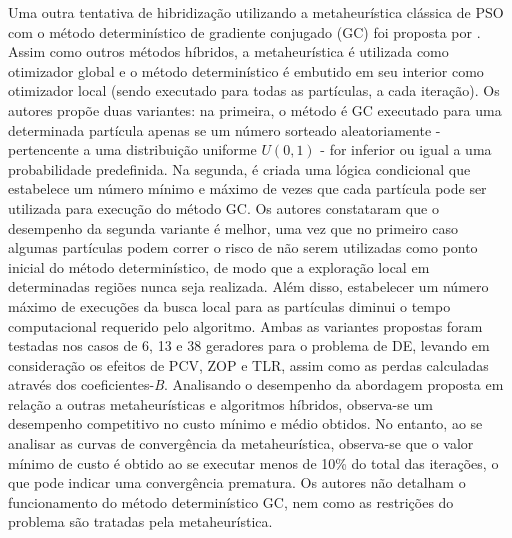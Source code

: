 \documentclass[
	12pt,				%
	openany,			%
	twoside,			%
	a4paper,			%
	chapter=TITLE,		%
	section=Title,		%
	subsection=Title,	%
	subsubsection=Title,%
	english,			%
	french,				%
	spanish,			%
	brazil			%
	]{abntex2}
\begin{document}
\begin{ERRATA}
Uma outra tentativa de hibridização utilizando a metaheurística clássica de PSO com o método determinístico de gradiente conjugado (GC) foi proposta por . Assim como outros métodos híbridos, a metaheurística é utilizada como otimizador global e o método determinístico é embutido em seu interior como otimizador local (sendo executado para todas as partículas, a cada iteração). Os autores propõe duas variantes: na primeira, o método é GC executado para uma determinada partícula apenas se um número sorteado aleatoriamente - pertencente a uma distribuição uniforme $U(0,1)$ - for inferior ou igual a uma probabilidade predefinida. Na segunda, é criada uma lógica condicional que estabelece um número mínimo e máximo de vezes que cada partícula pode ser utilizada para execução do método GC. Os autores constataram que o desempenho da segunda variante é melhor, uma vez que no primeiro caso algumas partículas podem correr o risco de não serem utilizadas como ponto inicial do método determinístico, de modo que a exploração local em determinadas regiões nunca seja realizada. Além disso, estabelecer um número máximo de execuções da busca local para as partículas diminui o tempo computacional requerido pelo algoritmo. Ambas as variantes propostas foram testadas nos casos de 6, 13 e 38 geradores para o problema de DE, levando em consideração os efeitos de PCV, ZOP e TLR, assim como as perdas calculadas através dos coeficientes-\emph{B}. Analisando o desempenho da abordagem proposta em relação a outras metaheurísticas e algoritmos híbridos, observa-se um desempenho competitivo no custo mínimo e médio obtidos. No entanto, ao se analisar as curvas de convergência da metaheurística, observa-se que o valor mínimo de custo é obtido ao se executar menos de 10\% do total das iterações, o que pode indicar uma convergência prematura. Os autores não detalham o funcionamento do método determinístico GC, nem como as restrições do problema são tratadas pela metaheurística. 



\end{ERRATA}
\end{document}
